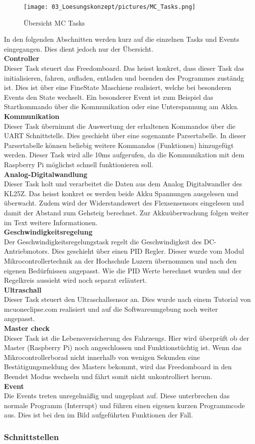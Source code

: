 \begin{figure}[H]
	\centering
	\texttt{[image: 03\_Loesungskonzept/pictures/MC\_Tasks.png]}
	\caption{Übersicht MC Tasks}
\end{figure}
In den folgenden Abschnitten werden kurz auf die einzelnen Tasks und Events eingegangen. Dies dient jedoch nur der Übersicht.\\
\textbf{Controller}\\[0.2cm]
Dieser Task steuert das Freedomboard. Das heisst konkret, dass dieser Task das initialisieren, fahren, aufladen, entladen  und beenden des Programmes zuständg ist. Dies ist über eine FineState Maschiene realisiert, welche bei besonderen Events den State wechselt. Ein besonderer Event ist zum Beispiel das Startkommando über die Kommunikation oder eine Unterspannung am Akku.\\[0.2cm]
\textbf{Kommunikation}\\[0.2cm]
Dieser Task übernimmt die Auswertung der erhaltenen Kommandos über die UART Schnittstelle. Dies geschieht über eine sogenannte Parsertabelle. In dieser Parsertabelle können beliebig weitere Kommandos (Funktionen) hinzugefügt werden. Dieser Task wird alle 10ms aufgerufen, da die Kommunikation mit dem Raspberry Pi möglichst schnell funktionieren soll.\\[0.2cm]
\textbf{Analog-Digitalwandlung}\\[0.2cm]
Dieser Task holt und verarbeitet die Daten aus dem Analog Digitalwandler des KL25Z. Das heisst konkret es werden beide Akku Spannungen ausgelesen und überwacht. Zudem wird der Widerstandswert des Flexsensensors eingelesen und damit der Abstand zum Gehsteig berechnet. Zur Akkuüberwachung folgen weiter im Text weitere Informationen.\\[0.2cm]
\textbf{Geschwindigkeitsregelung}\\[0.2cm]
Der Geschwindigkeitsregelungstask regelt die Geschwindigkeit des DC-Antriebmotors. Dies geschieht über einen PID Regler. Dieser wurde vom Modul Mikrocontrollertechnik an der Hochschule Luzern übernommen und nach den eigenen Bedürfnissen angepasst. Wie die PID Werte berechnet wurden und der Regelkreis aussieht wird noch separat erläutert.\\[0.2cm]
\textbf{Ultraschall}\\[0.2cm]
Dieser Task steuert den Ultraschallsensor an. Dies wurde nach einem Tutorial von mcuoneclipse.com realisiert und auf die Softwareumgebung noch weiter angepasst.\\[0.2cm]
\textbf{Master check}\\[0.2cm]
Dieser Task ist die Lebensversicherung des Fahrzeugs. Hier wird überprüft ob der Master (Raspberry Pi) noch angeschlossen und Funktionstüchtig ist. Wenn das Mikrocontrollerborad nicht innerhalb von wenigen Sekunden eine Bestätigungsmeldung des Masters bekommt, wird das Freedomboard in den Beendet Modus wechseln und fährt somit nicht unkontrolliert herum. \\[0.2cm]
\textbf{Event}\\[0.2cm]
Die Events treten unregelmäßig und ungeplant auf. Diese unterbrechen das normale Programm (Interrupt) und führen einen eigenen kurzen Programmcode aus. Dies ist bei den im Bild aufgeführten Funktionen der Fall.\\[0.2cm]
\subsubsection{Schnittstellen}